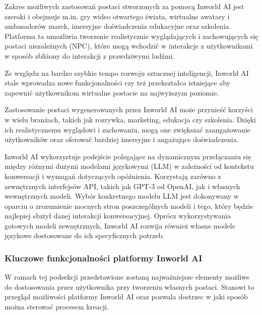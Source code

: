 Zakres możliwych zastosowań postaci stworzonych za pomocą Inworld AI jest szeroki i obejmuje m.in. gry
wideo otwartego świata, wirtualne awatary i ambasadorów marek, imersyjne doświadczenia edukacyjne oraz
szkolenia. Platforma ta umożliwia tworzenie realistycznie wyglądających i zachowujących się postaci
niezależnych (NPC), które mogą wchodzić w interakcje z użytkownikami w sposób zbliżony do interakcji z
prawdziwymi ludźmi.

Ze względu na bardzo szybkie tempo rozwoju sztucznej inteligencji, Inworld AI stale wprowadza nowe
funkcjonalności czy też przekształca istniejące aby zapewnić użytkownikom wirtualne postacie na
najwyższym poziomie.

Zastosowanie postaci wygenerowanych przez Inworld AI może przynieść korzyści w wielu branżach, takich
jak rozrywka, marketing, edukacja czy szkolenia. Dzięki ich realistycznemu wyglądowi i zachowaniu, mogą
one zwiększać zaangażowanie użytkowników oraz oferować bardziej imersyjne i angażujące doświadczenia.

Inworld AI wykorzystuje podejście polegające na dynamicznym przełączaniu się między różnymi dużymi
modelami językowymi (LLM) w zależności od kontekstu konwersacji i wymagań dotyczących opóźnienia\cite{inworld_docs}.
Korzystają zarówno z zewnętrznych interfejsów API, takich jak GPT-3 od OpenAI, jak i własnych
wewnętrznych modeli\cite{inworld_docs}. Wybór konkretnego modelu LLM jest dokonywany w oparciu o zrozumienie mocnych
stron poszczególnych modeli i tego, który będzie najlepiej służył danej interakcji konwersacyjnej.
Oprócz wykorzystywania gotowych modeli zewnętrznych, Inworld AI rozwija również własne modele
językowe dostosowane do ich specyficznych potrzeb\cite{inworld_docs}.

\subsubsection*{Kluczowe funkcjonalności platformy Inworld AI}

W ramach tej podsekcji przedstawione zostaną najważniejsze elementy możliwe do dostosowania przez
użytkownika przy tworzeniu własnych postaci. Stanowi to przegląd możliwości platformy Inworld AI
oraz pozwala dostrzec w jaki sposób można sterować procesem kreacji.

